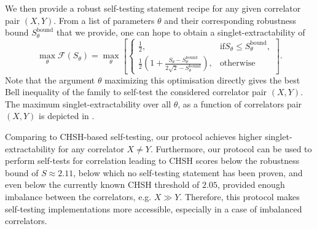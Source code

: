 We then provide a robust self-testing statement recipe for any given correlator pair $(X,Y)$.
From a list of parameters $\theta$ and their corresponding robustness bound $S_\theta^\text{bound}$ that we provide, one can hope to obtain a singlet-extractability of 
\begin{equation}
	\max_\theta \mathcal{F}(S_\theta) = \max_\theta \left[ \begin{cases}
			\frac{1}{2},& \text{if} S_\theta \leq S_\theta^\text{bound}, \\
			\frac{1}{2}\left(1+\frac{S_\theta - S_\theta^\text{bound}}{2\sqrt{2}-S_\theta^\text{bound}}\right), & \text{otherwise}
	\end{cases} \right].
	\label{eq:singlet-extractability-theta}
\end{equation}
Note that the argument $\theta$ maximizing this optimisation directly gives the best Bell inequality of the family  to self-test the considered correlator pair $(X,Y)$.
The maximum singlet-extractability over all $\theta$, as a function of correlators pair $(X,Y)$ is depicted in .

Comparing to CHSH-based self-testing, our protocol achieves higher singlet-extractability for any correlator $X\neq Y$.
Furthermore, our protocol can be used to perform self-tests for correlation leading to CHSH scores below the robustness bound of $S\approx 2.11$, below which no self-testing statement has been proven, and even below the currently known CHSH threshold of $2.05$, provided enough imbalance between the correlators, e.g. $X \gg Y$.
Therefore, this protocol makes self-testing implementations more accessible, especially in a case of imbalanced correlators.


